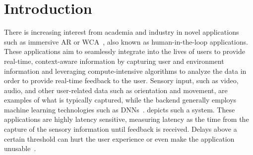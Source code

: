 \section{Introduction}\label{paper:olguinmunoz2019edgedroid:sec:intro}

There is increasing interest from academia and industry in novel applications such as immersive \gls{AR} or \gls{WCA}~\cite{chatzopoulos2017hyperion,ha2014towards}, also known as human-in-the-loop applications.
These applications aim to seamlessly integrate into the lives of users to provide real-time, context-aware information by capturing user and environment information and leveraging compute-intensive algorithms to analyze the data in order to provide real-time feedback to the user.
Sensory input, such as video, audio, and other user-related data such as orientation and movement, are examples of what is typically captured, while the backend generally employs machine learning technologies such as \glspl{DNN}~\cite{ha2014towards}.
 depicts such a system.
These applications are highly latency sensitive, measuring latency as the time from the capture of the sensory information until feedback is received.
Delays above a certain threshold can hurt the user experience or even make the application unusable~\cite{chen2017empirical}.

